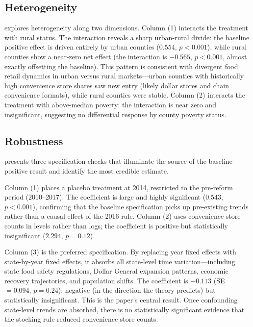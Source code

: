 \documentclass[12pt]{article}
\begin{document}
\subsection{Heterogeneity}



 explores heterogeneity along two dimensions. Column (1) interacts the treatment with rural status. The interaction reveals a sharp urban-rural divide: the baseline positive effect is driven entirely by urban counties ($0.554$, $p < 0.001$), while rural counties show a near-zero net effect (the interaction is $-0.565$, $p < 0.001$, almost exactly offsetting the baseline). This pattern is consistent with divergent food retail dynamics in urban versus rural markets---urban counties with historically high convenience store shares saw new entry (likely dollar stores and chain convenience formats), while rural counties were stable. Column (2) interacts the treatment with above-median poverty: the interaction is near zero and insignificant, suggesting no differential response by county poverty status.

\subsection{Robustness}



 presents three specification checks that illuminate the source of the baseline positive result and identify the most credible estimate.

Column (1) places a placebo treatment at 2014, restricted to the pre-reform period (2010--2017). The coefficient is large and highly significant ($0.543$, $p < 0.001$), confirming that the baseline specification picks up pre-existing trends rather than a causal effect of the 2016 rule. Column (2) uses convenience store counts in levels rather than logs; the coefficient is positive but statistically insignificant ($2.294$, $p = 0.12$).

Column (3) is the preferred specification. By replacing year fixed effects with state-by-year fixed effects, it absorbs all state-level time variation---including state food safety regulations, Dollar General expansion patterns, economic recovery trajectories, and population shifts. The coefficient is $-0.113$ (SE $= 0.094$, $p = 0.24$): negative (in the direction the theory predicts) but statistically insignificant. This is the paper's central result. Once confounding state-level trends are absorbed, there is no statistically significant evidence that the stocking rule reduced convenience store counts.
\end{document}
